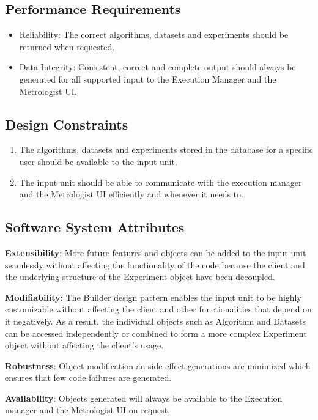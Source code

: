 \subsection{Performance Requirements}
\begin{itemize}
	\item Reliability: The correct algorithms, datasets and experiments should be returned when requested. \newline
    \item Data Integrity: Consistent, correct and complete output should always be generated for all supported input to the Execution Manager and the Metrologist UI. \newline
\end{itemize}
\subsection{Design Constraints}
\begin{enumerate}
	\item The algorithms, datasets and experiments stored in the database for a specific user should be available to the input unit.
	\item The input unit should be able to communicate with the execution manager and the Metrologist UI efficiently and whenever it needs to. 
\end{enumerate}
\subsection{Software System Attributes}
\begin{flushleft}
    \par\textbf{Extensibility}: More future features and objects can be added to the input unit seamlessly without affecting the functionality of the code because the client and the underlying structure of the Experiment object have been decoupled.\newline
    
    \par\textbf{Modifiability: } The Builder design pattern enables the input unit to be highly customizable without affecting the client and other functionalities that depend on it negatively. As a result, the individual objects such as Algorithm and Datasets can be accessed independently or combined to form a more complex Experiment object without affecting the client's usage.\newline
  
    \par\textbf{Robustness}: Object modification an side-effect generations are minimized which ensures that few code failures are generated. \newline
    
    \par\textbf{Availability}: Objects generated will always be available to the Execution manager and the Metrologist UI on request. \newline
    \end{flushleft}

